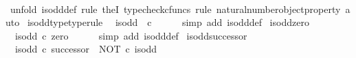 \begin{isabellebody}
%
\isadelimproof
\ \ %
\endisadelimproof
%
\isatagproof
{}\isamarkupfalse%
\ {\isacharparenleft}{\kern0pt}unfold\ is{\isacharunderscore}{\kern0pt}odd{\isacharunderscore}{\kern0pt}def{\isacharcomma}{\kern0pt}\ rule\ theI{\isacharprime}{\kern0pt}{\isacharcomma}{\kern0pt}\ typecheck{\isacharunderscore}{\kern0pt}cfuncs{\isacharcomma}{\kern0pt}\ rule\ natural{\isacharunderscore}{\kern0pt}number{\isacharunderscore}{\kern0pt}object{\isacharunderscore}{\kern0pt}property{}{\isacharcomma}{\kern0pt}\ auto{\isacharparenright}{\kern0pt}%
\endisatagproof
{\isafoldproof}%
%
\isadelimproof
\isanewline
%
\endisadelimproof
\isanewline
{}\isamarkupfalse%
\ is{\isacharunderscore}{\kern0pt}odd{\isacharunderscore}{\kern0pt}type{\isacharbrackleft}{\kern0pt}type{\isacharunderscore}{\kern0pt}rule{\isacharbrackright}{\kern0pt}{\isacharcolon}{\kern0pt}\isanewline
\ \ {\isachardoublequoteopen}is{\isacharunderscore}{\kern0pt}odd\ {\isacharcolon}{\kern0pt}\ {\isasymnat}\isactrlsub c\ {\isasymrightarrow}\ {\isasymOmega}{\isachardoublequoteclose}\isanewline
%
\isadelimproof
\ \ %
\endisadelimproof
%
\isatagproof
{}\isamarkupfalse%
\ {\isacharparenleft}{\kern0pt}simp\ add{\isacharcolon}{\kern0pt}\ is{\isacharunderscore}{\kern0pt}odd{\isacharunderscore}{\kern0pt}def{}{\isacharparenright}{\kern0pt}%
\endisatagproof
{\isafoldproof}%
%
\isadelimproof
\isanewline
%
\endisadelimproof
\isanewline
{}\isamarkupfalse%
\ is{\isacharunderscore}{\kern0pt}odd{\isacharunderscore}{\kern0pt}zero{\isacharcolon}{\kern0pt}\isanewline
\ \ {\isachardoublequoteopen}is{\isacharunderscore}{\kern0pt}odd\ {\isasymcirc}\isactrlsub c\ zero\ {\isacharequal}{\kern0pt}\ {\isasymf}{\isachardoublequoteclose}\isanewline
%
\isadelimproof
\ \ %
\endisadelimproof
%
\isatagproof
{}\isamarkupfalse%
\ {\isacharparenleft}{\kern0pt}simp\ add{\isacharcolon}{\kern0pt}\ is{\isacharunderscore}{\kern0pt}odd{\isacharunderscore}{\kern0pt}def{}{\isacharparenright}{\kern0pt}%
\endisatagproof
{\isafoldproof}%
%
\isadelimproof
\isanewline
%
\endisadelimproof
\isanewline
{}\isamarkupfalse%
\ is{\isacharunderscore}{\kern0pt}odd{\isacharunderscore}{\kern0pt}successor{\isacharcolon}{\kern0pt}\isanewline
\ \ {\isachardoublequoteopen}is{\isacharunderscore}{\kern0pt}odd\ {\isasymcirc}\isactrlsub c\ successor\ {\isacharequal}{\kern0pt}\ NOT\ {\isasymcirc}\isactrlsub c\ is{\isacharunderscore}{\kern0pt}odd{\isachardoublequoteclose}\isanewline
%
\isadelimproof
\ \ %
\endisadelimproof
%
\isatagproof
{}\isamarkupfalse%

\end{isabellebody}
